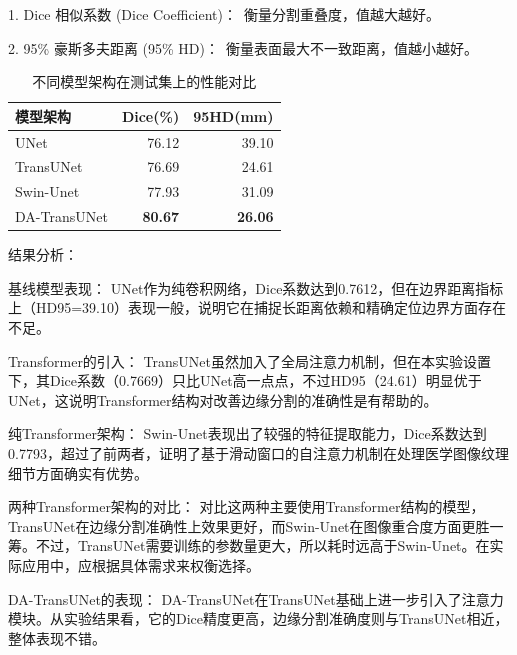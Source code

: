\documentclass{xduugthesis}
\begin{document}
1. Dice 相似系数 (Dice Coefficient)： 衡量分割重叠度，值越大越好。

2. 95\% 豪斯多夫距离 (95\% HD)： 衡量表面最大不一致距离，值越小越好。

\begin{table}[htbp]
  \centering
  \caption{不同模型架构在测试集上的性能对比}
  \label{tab:model_comparison}
  
  \begin{tabular}{|l|r|r|}
    \hline
    \textbf{模型架构} & \textbf{Dice(\%)} & \textbf{95HD(mm)} \\
    \hline
    UNet & 76.12 & 39.10 \\
    \hline
    TransUNet & 76.69 & 24.61 \\
    \hline
    Swin-Unet & 77.93 & 31.09 \\
    \hline
    DA-TransUNet & \textbf{80.67} & \textbf{26.06} \\
    \hline
  \end{tabular}
\end{table}

结果分析：

基线模型表现： UNet作为纯卷积网络，Dice系数达到0.7612，但在边界距离指标上（HD95=39.10）表现一般，说明它在捕捉长距离依赖和精确定位边界方面存在不足。

Transformer的引入： TransUNet虽然加入了全局注意力机制，但在本实验设置下，其Dice系数（0.7669）只比UNet高一点点，不过HD95（24.61）明显优于UNet，这说明Transformer结构对改善边缘分割的准确性是有帮助的。

纯Transformer架构： Swin-Unet表现出了较强的特征提取能力，Dice系数达到0.7793，超过了前两者，证明了基于滑动窗口的自注意力机制在处理医学图像纹理细节方面确实有优势。

两种Transformer架构的对比： 对比这两种主要使用Transformer结构的模型，TransUNet在边缘分割准确性上效果更好，而Swin-Unet在图像重合度方面更胜一筹。不过，TransUNet需要训练的参数量更大，所以耗时远高于Swin-Unet。在实际应用中，应根据具体需求来权衡选择。

DA-TransUNet的表现： DA-TransUNet在TransUNet基础上进一步引入了注意力模块。从实验结果看，它的Dice精度更高，边缘分割准确度则与TransUNet相近，整体表现不错。
\end{document}
